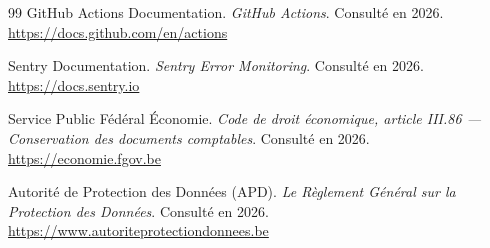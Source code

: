 \documentclass{article}
\begin{document}
\begin{thebibliography}{99}
GitHub Actions Documentation. \textit{GitHub Actions}.
Consulté en 2026. \url{https://docs.github.com/en/actions}

Sentry Documentation. \textit{Sentry Error Monitoring}.
Consulté en 2026. \url{https://docs.sentry.io}

Service Public Fédéral Économie. \textit{Code de droit économique,
article III.86 — Conservation des documents comptables}.
Consulté en 2026. \url{https://economie.fgov.be}

Autorité de Protection des Données (APD). 
\textit{Le Règlement Général sur la Protection des Données}.
Consulté en 2026. \url{https://www.autoriteprotectiondonnees.be}

\end{thebibliography}                                                                                                                                                                                                                                                   
\end{document}
